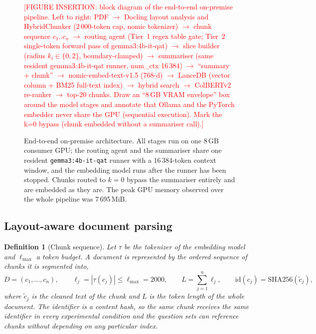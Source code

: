 \documentclass[pdflatex,sn-mathphys-num]{sn-jnl}
\newcommand{\todo}[1]{\textcolor{red}{#1}}
\theoremstyle{thmstyleone}%
\theoremstyle{thmstylethree}%
\newtheorem{definition}{Definition}%
\begin{document}
\begin{figure}[htbp]
  \centering
  \todo{[FIGURE INSERTION: block diagram of the end-to-end on-premise pipeline. Left to right: PDF $\rightarrow$ Docling layout analysis and HybridChunker (2\,000-token cap, nomic tokenizer) $\rightarrow$ chunk sequence $c_1..c_n$ $\rightarrow$ routing agent (Tier~1 regex table gate; Tier~2 single-token forward pass of gemma3:4b-it-qat) $\rightarrow$ slice builder (radius $k_i\in\{0,2\}$, boundary-clamped) $\rightarrow$ summariser (same resident gemma3:4b-it-qat runner, num\_ctx 16\,384) $\rightarrow$ ``summary + chunk'' $\rightarrow$ nomic-embed-text-v1.5 (768-d) $\rightarrow$ LanceDB (vector column + BM25 full-text index) $\rightarrow$ hybrid search $\rightarrow$ ColBERTv2 re-ranker $\rightarrow$ top-20 chunks. Draw an ``8\,GB VRAM envelope'' box around the model stages and annotate that Ollama and the PyTorch embedder never share the GPU (sequential execution). Mark the k=0 bypass (chunk embedded without a summariser call).]}
  \caption{End-to-end on-premise architecture. All stages run on one 8\,GB consumer GPU; the routing agent and the summariser share one resident \texttt{gemma3:4b-it-qat} runner with a 16\,384-token context window, and the embedding model runs after the runner has been stopped. Chunks routed to $k=0$ bypass the summariser entirely and are embedded as they are. The peak GPU memory observed over the whole pipeline was 7\,695\,MiB.}
  \label{fig:architecture}
\end{figure}

\subsection{Layout-aware document parsing}\label{sec:parsing}

\begin{definition}[Chunk sequence]\label{def:chunks}
Let $\tau$ be the tokenizer of the embedding model and $\ell_{\max}$ a token budget. A document is represented by the ordered sequence of chunks it is segmented into,
\begin{equation}\label{eq:chunks}
D=(c_1,\dots,c_n),\qquad \ell_j=|\tau(c_j)|\le \ell_{\max}=2000,\qquad L=\sum_{j=1}^{n}\ell_j,\qquad \mathrm{id}(c_j)=\mathrm{SHA256}(\tilde c_j),
\end{equation}
where $\tilde c_j$ is the cleaned text of the chunk and $L$ is the token length of the whole document. The identifier is a content hash, so the same chunk receives the same identifier in every experimental condition and the question sets can reference chunks without depending on any particular index.
\end{definition}
\end{document}
